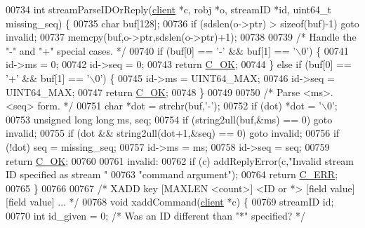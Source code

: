 \begin{DoxyCode}
{{00734 \textcolor{keywordtype}{int} streamParseIDOrReply(\hyperlink{structclient}{client} *c, robj *o, streamID *id, uint64\_t missing\_seq) \{
00735     \textcolor{keywordtype}{char} buf[128];
00736     \textcolor{keywordflow}{if} (sdslen(o->ptr) > \textcolor{keyword}{sizeof}(buf)-1) \textcolor{keywordflow}{goto} invalid;
00737     memcpy(buf,o->ptr,sdslen(o->ptr)+1);
00738 
00739     \textcolor{comment}{/* Handle the "-" and "+" special cases. */}
00740     \textcolor{keywordflow}{if} (buf[0] == \textcolor{stringliteral}{'-'} && buf[1] == \textcolor{stringliteral}{'\(\backslash\)0'}) \{
00741         id->ms = 0;
00742         id->seq = 0;
00743         \textcolor{keywordflow}{return} \hyperlink{server_8h_a303769ef1065076e68731584e758d3e1}{C\_OK};
00744     \} \textcolor{keywordflow}{else} \textcolor{keywordflow}{if} (buf[0] == \textcolor{stringliteral}{'+'} && buf[1] == \textcolor{stringliteral}{'\(\backslash\)0'}) \{
00745         id->ms = UINT64\_MAX;
00746         id->seq = UINT64\_MAX;
00747         \textcolor{keywordflow}{return} \hyperlink{server_8h_a303769ef1065076e68731584e758d3e1}{C\_OK};
00748     \}
00749 
00750     \textcolor{comment}{/* Parse <ms>.<seq> form. */}
00751     \textcolor{keywordtype}{char} *dot = strchr(buf,\textcolor{stringliteral}{'-'});
00752     \textcolor{keywordflow}{if} (dot) *dot = \textcolor{stringliteral}{'\(\backslash\)0'};
00753     \textcolor{keywordtype}{unsigned} \textcolor{keywordtype}{long} \textcolor{keywordtype}{long} ms, seq;
00754     \textcolor{keywordflow}{if} (string2ull(buf,&ms) == 0) \textcolor{keywordflow}{goto} invalid;
00755     \textcolor{keywordflow}{if} (dot && string2ull(dot+1,&seq) == 0) \textcolor{keywordflow}{goto} invalid;
00756     \textcolor{keywordflow}{if} (!dot) seq = missing\_seq;
00757     id->ms = ms;
00758     id->seq = seq;
00759     \textcolor{keywordflow}{return} \hyperlink{server_8h_a303769ef1065076e68731584e758d3e1}{C\_OK};
00760 
00761 invalid:
00762     \textcolor{keywordflow}{if} (c) addReplyError(c,\textcolor{stringliteral}{"Invalid stream ID specified as stream "}
00763                            \textcolor{stringliteral}{"command argument"});
00764     \textcolor{keywordflow}{return} \hyperlink{server_8h_af98ac28d5f4d23d7ed5985188e6fb7d1}{C\_ERR};
00765 \}
00766 
00767 \textcolor{comment}{/* XADD key [MAXLEN <count>] <ID or *> [field value] [field value] ... */}
00768 \textcolor{keywordtype}{void} xaddCommand(\hyperlink{structclient}{client} *c) \{
00769     streamID id;
00770     \textcolor{keywordtype}{int} id\_given = 0; \textcolor{comment}{/* Was an ID different than "*" specified? */}
}}
\end{DoxyCode}
